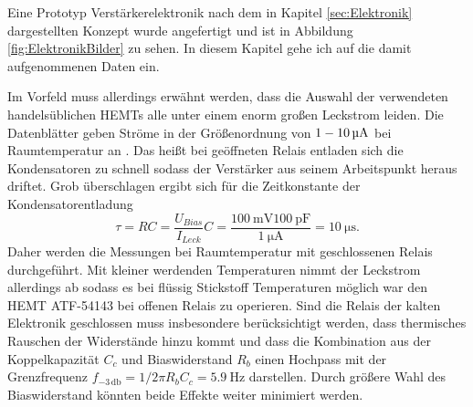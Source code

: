 Eine Prototyp Verstärkerelektronik nach dem in Kapitel \ref{sec:Elektronik} dargestellten Konzept wurde angefertigt und ist in Abbildung \ref{fig:ElektronikBilder} zu sehen.
In diesem Kapitel gehe ich auf die damit aufgenommenen Daten ein.

Im Vorfeld muss allerdings erwähnt werden, dass die Auswahl der verwendeten handelsüblichen HEMTs alle unter einem enorm großen Leckstrom leiden.
Die Datenblätter geben Ströme in der Größenordnung von $\SI{1}{} \-- \SI{10}{\micro\ampere}$ bei Raumtemperatur an \cite{ATF-54143, ATF-33143, ATF-34143}.
Das heißt bei geöffneten Relais entladen sich die Kondensatoren zu schnell sodass der Verstärker aus seinem Arbeitspunkt heraus driftet.
Grob überschlagen ergibt sich für die Zeitkonstante der Kondensatorentladung
\begin{equation}
\tau = RC =  \frac{U_{Bias}}{I_{Leck}}C  = \frac{\SI{100}{\milli\volt}\SI{100}{\pico\farad}}{\SI{1}{\micro\ampere}} = \SI{10}{\micro\second}.
\end{equation}
Daher werden die Messungen bei Raumtemperatur mit geschlossenen Relais durchgeführt.
Mit kleiner werdenden Temperaturen nimmt der Leckstrom allerdings ab sodass es bei flüssig Stickstoff Temperaturen möglich war den HEMT ATF-54143 bei offenen Relais zu operieren.
Sind die Relais der kalten Elektronik geschlossen muss insbesondere berücksichtigt werden, dass thermisches Rauschen der Widerstände hinzu kommt und dass die Kombination aus der Koppelkapazität $C_c$ und Biaswiderstand $R_b$ einen Hochpass mit der Grenzfrequenz $f_{-3\,\mathrm{db}}=1/2\pi R_bC_c=\SI{5.9}{\hertz}$ darstellen.
Durch größere Wahl des Biaswiderstand könnten beide Effekte weiter minimiert werden.

